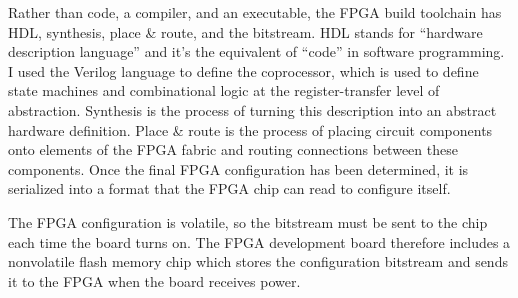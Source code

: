 Rather than code, a compiler, and an executable, the FPGA build toolchain has HDL, synthesis, place \& route, and the bitstream. HDL stands for ``hardware description language'' and it's the equivalent of ``code'' in software programming. I used the Verilog language to define the coprocessor, which is used to define state machines and combinational logic at the register-transfer level of abstraction. Synthesis is the process of turning this description into an abstract hardware definition. Place \& route is the process of placing circuit components onto elements of the FPGA fabric and routing connections between these components. Once the final FPGA configuration has been determined, it is serialized into a format that the FPGA chip can read to configure itself\cite{IceStorm}.

The FPGA configuration is volatile, so the bitstream must be sent to the chip each time the board turns on. The FPGA development board therefore includes a nonvolatile flash memory chip which stores the configuration bitstream and sends it to the FPGA when the board receives power\cite{iCEBreaker}.
